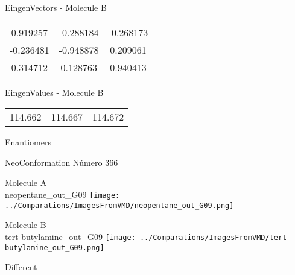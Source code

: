 \begin{multicols}{2}
\begin{center}
\vtab
 EingenVectors - Molecule B     \\
\vtab
\begin{tabular}{|c c c|}
0.919257	 & 	-0.288184	 & 	-0.268173	 \\
-0.236481	 & 	-0.948878	 & 	0.209061	 \\
0.314712	 & 	0.128763	 & 	0.940413
\end{tabular}

\vtab
 EingenValues - Molecule B     \\
\vtab
\begin{tabular}{|c c c|}
114.662	 & 	114.667	 & 	114.672	 \\
\end{tabular}

\end{center}
\end{multicols}
\begin{center}
\vtab
\vtab
\textcolor{NavyBlue}{\Large Enantiomers}
\end{center}

 \newpage

\vtab[-2cm]
\begin{center}
{\large NeoConformation \tab Número 366}
\end{center}
\begin{multicols}{2}
\begin{center}
Molecule A \\ 
neopentane\_out\_G09
\texttt{[image: ../Comparations/ImagesFromVMD/neopentane\_out\_G09.png]}
\\
\vtab

\columnbreak
Molecule B \\ 
tert-butylamine\_out\_G09
\texttt{[image: ../Comparations/ImagesFromVMD/tert-butylamine\_out\_G09.png]}
\\
\vtab


\end{center}
\end{multicols}
\begin{center}
\vtab
\vtab
\textcolor{NavyBlue}{\Large Different}
\end{center}

 \newpage

